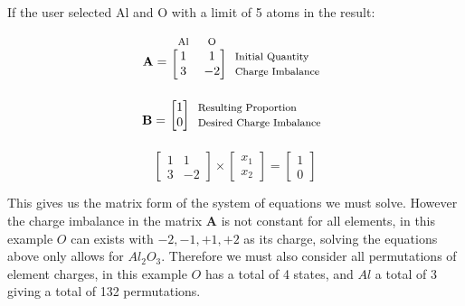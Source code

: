 \documentclass[a4paper, 12pt]{article}
\begin{document}
\pagebreak
\begin{center}
	If the user selected Al and O with a limit of 5 atoms in the result:
\end{center}
\begin{equation*}
	\mathbf{A}=
	\begin{blockarray}{*{2}{c} l}
		\begin{block}{*{2}{>{$\footnotesize}c<{$}} l}
			Al & O  \\
		\end{block}
		\begin{block}{[*{2}{c}]>{$\footnotesize}l<{$}}
			1 & 1 & Initial Quantity \\
			3 & -2 & Charge Imbalance \\
		\end{block}
	\end{blockarray}
\end{equation*}
\begin{equation*}
	\mathbf{B}=
		\begin{blockarray}{*{1}{c} l}
		\begin{block}{[*{1}{c}]>{$\footnotesize}l<{$}}
			1 &  Resulting Proportion \\
			0 &  Desired Charge Imbalance \\
		\end{block}
	\end{blockarray}
\end{equation*}
\begin{equation*}
	\begin{bmatrix}
	1 & 1 \\
	3 & -2
	\end{bmatrix}
	\times
	\begin{bmatrix}
	x_1 \\
	x_2
	\end{bmatrix}
	=
	\begin{bmatrix}
	1 \\
	0 
	\end{bmatrix}
\end{equation*}

\vspace*{0.5em}
This gives us the matrix form of the system of equations we must solve. However the charge imbalance in the matrix $\mathbf{A}$ is not constant for all elements, in this example $O$ can exists with $-2, -1, +1, +2$ as its charge, solving the equations above only allows for $Al_2O_3$. Therefore we must also consider all permutations of element charges, in this example $O$ has a total of 4 states, and $Al$ a total of 3 giving a total of 132 permutations. \\
\end{document}
